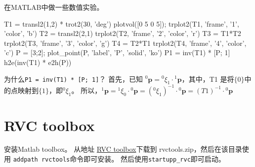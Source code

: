 \documentclass[UTF8,a4paper,10pt]{ctexart}
\begin{document}
在MATLAB中做一些数值实验。
\begin{matlab}
  T1 = transl2(1,2) * trot2(30, 'deg')
  plotvol([0 5 0 5]); trplot2(T1, 'frame', '1', 'color', 'b')
  T2 = transl2(2,1)
  trplot2(T2, 'frame', '2', 'color', 'r')
  T3 = T1*T2
  trplot2(T3, 'frame', '3', 'color', 'g')
  T4 = T2*T1
  trplot2(T4, 'frame', '4', 'color', 'c')
  P = [3;2];
  plot_point(P, 'label', 'P', 'solid', 'ko')
  P1 = inv(T1) * [P; 1]
  h2e(inv(T1) * e2h(P))
\end{matlab}
为什么\verb|P1 = inv(T1) * [P; 1]|？
首先，已知 ${}^0\mathbf{p}={}^0\xi_1\cdot{}^1\mathbf{p}$，其中，T1 是将$\{0\}$中的点映射到$\{1\}$，即${}^0\xi_1$。
所以，${}^1\mathbf{p}={}^1\xi_0\cdot{}^0\mathbf{p}=({}^0\xi_1)^{-1}\cdot{}^0\mathbf{p}=(T1)^{-1}\cdot{}^0\mathbf{p}$



 



















\appendix
\section{RVC toolbox}
安装Matlab toolbox。
从地址 \href{https://petercorke.com/RVC}{RVC toolbox}下载到 rvctools.zip，然后在该目录使用 \verb|addpath rvctools|命令即可安装。
然后使用\verb|startupp_rvc|即可启动。



\end{document}
